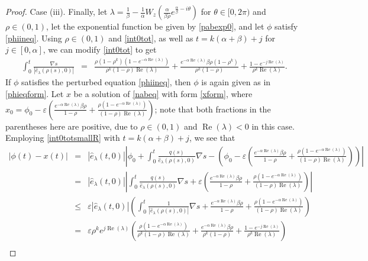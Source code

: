 \documentclass[10pt,a4paper]{amsart}
\begin{document}
\begin{proof}
Case (iii).
Finally, let $\lambda = \frac{1}{\beta}-\frac{1}{\alpha}W_z\left(\frac{\alpha}{\beta \rho}e^{\frac{\alpha}{\beta}-i\theta}\right)$ for $\theta\in[0,2\pi)$ and $\rho\in(0,1)$, let the exponential function be given by \eqref{pabexp0}, and let $\phi$ satisfy \eqref{phiineq}. Using $\rho\in(0,1)$ and \eqref{int0tot}, as well as $t=k(\alpha+\beta)+j$ for $j\in[0,\alpha]$, we can modify \eqref{int0tot} to get
\begin{eqnarray}
 \int_{0}^{t} \frac{\nabla s}{|\widehat{e}_{\lambda}(\rho(s),0)|} 
  &=& \frac{\rho(1-\rho^k)(1-e^{-\alpha\operatorname{Re}(\lambda)})}{\rho^k(1-\rho)\operatorname{Re}(\lambda)} + \frac{e^{-\alpha\operatorname{Re}(\lambda)}\beta \rho(1-\rho^k)}{\rho^k(1-\rho)} + \frac{1-e^{-j\operatorname{Re}(\lambda)}}{\rho^k\operatorname{Re}(\lambda)} \label{int0totsmallR}. 
\end{eqnarray}
If $\phi$ satisfies the perturbed equation \eqref{phiineq}, then $\phi$ is again given as in \eqref{phieqform}.
Let $x$ be a solution of \eqref{nabeq} with form \eqref{xform}, where $x_0=\phi_0-\varepsilon\left(\frac{e^{-\alpha\operatorname{Re}(\lambda)}\beta \rho}{1-\rho}+\frac{\rho(1-e^{-\alpha\operatorname{Re}(\lambda)})}{(1-\rho)\operatorname{Re}(\lambda)}\right)$; note that both fractions in the parentheses here are positive, due to $\rho\in(0,1)$ and $\operatorname{Re}(\lambda)<0$ in this case. Employing \eqref{int0totsmallR} with $t=k(\alpha+\beta)+j$, we see that
\begin{eqnarray*}
 |\phi(t)-x(t)| &=& |\widehat{e}_{\lambda}(t,0)|\left|\phi_0+\int_0^t \frac{q(s)}{\widehat{e}_{\lambda}(\rho(s),0)}\nabla s-\left(\phi_0-\varepsilon\left(\frac{e^{-\alpha\operatorname{Re}(\lambda)}\beta \rho}{1-\rho}+\frac{\rho(1-e^{-\alpha\operatorname{Re}(\lambda)})}{(1-\rho)\operatorname{Re}(\lambda)}\right)\right)\right| \\
 &=& |\widehat{e}_{\lambda}(t,0)|\left|\int_0^t \frac{q(s)}{\widehat{e}_{\lambda}(\rho(s),0)}\nabla s+\varepsilon\left(\frac{e^{-\alpha\operatorname{Re}(\lambda)}\beta \rho}{1-\rho}+\frac{\rho(1-e^{-\alpha\operatorname{Re}(\lambda)})}{(1-\rho)\operatorname{Re}(\lambda)}\right)\right| \\
 &\le& \varepsilon |\widehat{e}_{\lambda}(t,0)|\left(\int_0^t \frac{1}{|\widehat{e}_{\lambda}(\rho(s),0)|}\nabla s + \frac{e^{-\alpha\operatorname{Re}(\lambda)}\beta \rho}{1-\rho}+\frac{\rho(1-e^{-\alpha\operatorname{Re}(\lambda)})}{(1-\rho)\operatorname{Re}(\lambda)}\right) \\
 &=& \varepsilon \rho^ke^{j\operatorname{Re}(\lambda)}\left(\frac{\rho(1-e^{-\alpha\operatorname{Re}(\lambda)})}{\rho^k(1-\rho)\operatorname{Re}(\lambda)} + \frac{e^{-\alpha\operatorname{Re}(\lambda)}\beta \rho}{\rho^k(1-\rho)} + \frac{1-e^{-j\operatorname{Re}(\lambda)}}{\rho^k\operatorname{Re}(\lambda)}\right) \\

\end{eqnarray*}
\end{proof}
\end{document}
